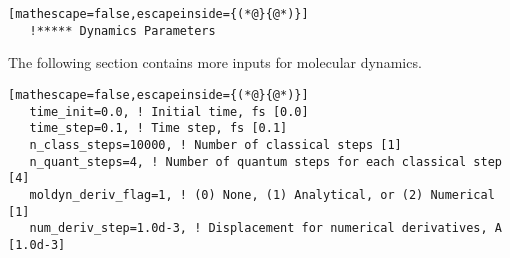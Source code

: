 \begin{lstlisting}[mathescape=false,escapeinside={(*@}{@*)}]
   !***** Dynamics Parameters
\end{lstlisting}
The following section contains more inputs for molecular dynamics.
\begin{lstlisting}[mathescape=false,escapeinside={(*@}{@*)}]
   time_init=0.0, ! Initial time, fs [0.0]
   time_step=0.1, ! Time step, fs [0.1]
   n_class_steps=10000, ! Number of classical steps [1]
   n_quant_steps=4, ! Number of quantum steps for each classical step [4]
   moldyn_deriv_flag=1, ! (0) None, (1) Analytical, or (2) Numerical [1]
   num_deriv_step=1.0d-3, ! Displacement for numerical derivatives, A [1.0d-3]
\end{lstlisting}


